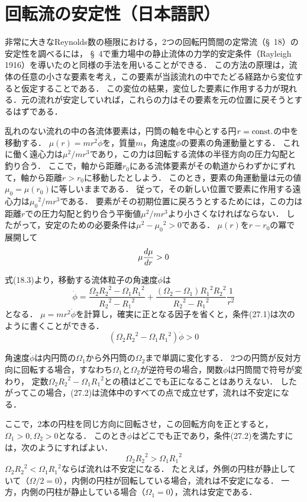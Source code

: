 \section{\spade 回転流の安定性（日本語訳）}
非常に大きなReynolds数の極限における，2つの回転円筒間の定常流（\S~18）の安定性を調べるには，
\S~4で重力場中の静止流体の力学的安定条件（Rayleigh 1916）を導いたのと同様の手法を用いることができる．
この方法の原理は，流体の任意の小さな要素を考え，この要素が当該流れの中でたどる経路から変位すると仮定することである．
この変位の結果，変位した要素に作用する力が現れる．元の流れが安定していれば，これらの力はその要素を元の位置に戻そうとするはずである．


乱れのない流れの中の各流体要素は，円筒の軸を中心とする円$r=\mathrm{const.}$の中を移動する．
$\mu(r)=mr^2\dot{\phi}$を，質量$m$，角速度$\dot{\phi}$の要素の角運動量とする．
これに働く遠心力は$\mu^2/mr^3$であり，この力は回転する流体の半径方向の圧力勾配と釣り合う．
ここで，軸から距離$r_0$にある流体要素がその軌道からわずかにずれて，軸から距離$r>r_0$に移動したとしよう．
このとき，要素の角運動量は元の値$\mu_0 = \mu(r_0)$に等しいままである．
従って，その新しい位置で要素に作用する遠心力は${\mu_0}^2/mr^3$である．
要素がその初期位置に戻ろうとするためには，この力は距離$r$での圧力勾配と釣り合う平衡値$\mu^2/mr^3$より小さくなければならない．
したがって，安定のための必要条件は$\mu^2-{\mu_0}^2>0$である．
$\mu(r)$を$r-r_0$の冪で展開して
\begin{equation}
    \mu \dv{\mu}{r} > 0
\end{equation}


式(18.3)より，移動する流体粒子の角速度$\dot{\phi}$は
\[
    \dot{\phi} = \frac{ \Omega_2{R_2}^2 - \Omega_1 {R_1}^2 }{ {R_2}^2 - {R_1}^2 }
    + \frac{ (\Omega_2-\Omega_1){R_1}^2{R_2}^2  }{ {R_2}^2 - {R_1}^2 } \frac{1}{r^2}
\]
となる．
$\mu=mr^2\dot{\phi}$を計算し，確実に正となる因子を省くと，条件(27.1)は次のように書くことができる．
\begin{equation}
    (\Omega_2{R_2}^2 - \Omega_1 {R_1}^2) \dot{\phi} > 0
\end{equation}


角速度$\dot{\phi}$は内円筒の$\Omega_1$から外円筒の$\Omega_2$まで単調に変化する．
2つの円筒が反対方向に回転する場合，すなわち$\Omega_1$と$\Omega_2$が逆符号の場合，関数$\dot{\phi}$は円筒間で符号が変わり，
定数$\Omega_2{R_2}^2 - \Omega_1 {R_1}^2$との積はどこでも正になることはありえない．
したがってこの場合，(27.2)は流体中のすべての点で成立せず，流れは不安定になる．


ここで，2本の円柱を同じ方向に回転させ，この回転方向を正とすると，$\Omega_1>0, \Omega_2>0$となる．
このとき$\dot{\phi}$はどこでも正であり，条件(27.2)を満たすには，次のようにすればよい．
\begin{equation}
    \Omega_2{R_2}^2 > \Omega_1 {R_1}^2
\end{equation}
$\Omega_2{R_2}^2 < \Omega_1 {R_1}^2$ならば流れは不安定になる．
たとえば，外側の円柱が静止していて（$\Omega/2=0$），内側の円柱が回転している場合，流れは不安定になる．
一方，内側の円柱が静止している場合（$\Omega_1=0$），流れは安定である．



